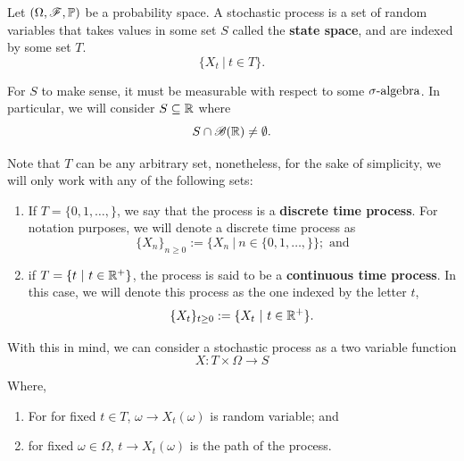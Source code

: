 \documentclass[../TGMAFFIRO.tex]{subfiles}
\begin{document}
\begin{definition}
	Let $(\Omega, \mathscr{F}, \mathbb{P})$ be a probability space. A stochastic process is a set of random variables that takes values in some set $S$ called the \textbf{state space}, and are indexed by some set $T$.
	\begin{equation}
		\{X_t \ | \ t \in T\}.
	\end{equation}
\end{definition}

For $S$ to make sense, it must be measurable with respect to some $\sigma\text{-algebra}$. In particular, we will consider $S \subseteq \mathbb{R}$ where
\[
	S \cap \mathscr{B}(\mathbb{R}) \neq \emptyset.
\]

Note that $T$ can be any arbitrary set, nonetheless, for the sake of simplicity, we will only work with any of the following sets:
\begin{enumerate}
	\item If $T = \{0, 1, \ldots, \}$, we say that the process is a \textbf{discrete time process}. For notation purposes, we will denote a discrete time process as
	\begin{equation}
		\{X_n\}_{n\geq 0}:= \{X_n \ | \ n \in \{0, 1, \ldots, \}\}; \text{ and}
	\end{equation}
	
	\item if $T = \{t \ | \ t\in\RNums^+\}$, the process is said to be a \textbf{continuous time process}. In this case, we will denote this process as the one indexed by the letter $t$,
	\begin{equation}
		\{X_t\}_{t\geq 0} := \{X_t \ | \ t \in \mathbb{R}^+\}.
	\end{equation}
\end{enumerate}

With this in mind, we can consider a stochastic process as a two variable function
\[
	X: T\times\Omega \to S
\]

Where,
\begin{enumerate}
	\item For for fixed $t\in T$, $\omega \to X_t(\omega)$ is random variable; and
	\item for fixed $\omega \in \Omega$, $t \to X_t(\omega)$ is the path of the process.
\end{enumerate}
\end{document}
